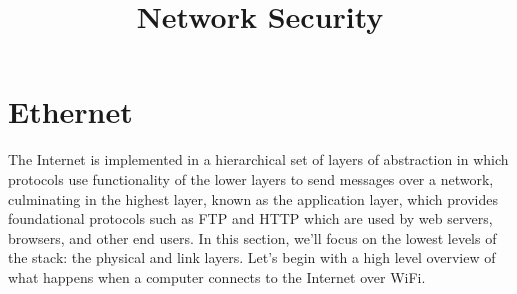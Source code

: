 \documentclass{article}
\begin{document}
\title{Network Security}
\maketitle

\section{Ethernet}
The Internet is implemented in a hierarchical set of layers of abstraction in which protocols use functionality of the lower layers to send messages over a network, culminating in the highest layer, known as the application layer, which provides foundational protocols such as FTP and HTTP which are used by web servers, browsers, and other end users. In this section, we'll focus on the lowest levels of the stack: the physical and link layers. Let's begin with a high level overview of what happens when a computer connects to the Internet over WiFi.
\end{document}
